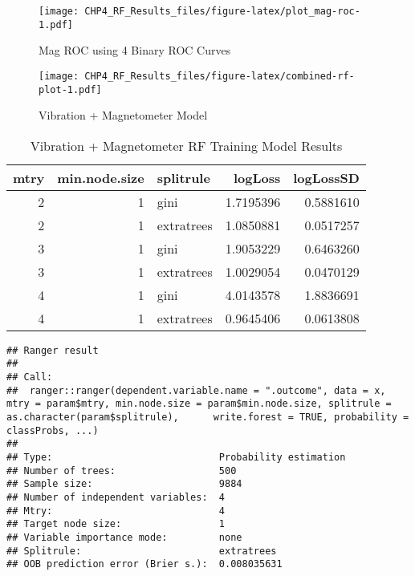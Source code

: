 \documentclass[]{article}
\begin{document}
\begin{figure}
\centering
\texttt{[image: CHP4\_RF\_Results\_files/figure-latex/plot\_mag-roc-1.pdf]}
\caption{Mag ROC using 4 Binary ROC Curves}
\end{figure}

\begin{figure}
\centering
\texttt{[image: CHP4\_RF\_Results\_files/figure-latex/combined-rf-plot-1.pdf]}
\caption{Vibration + Magnetometer Model}
\end{figure}

\begin{table}[!h]

\caption{\label{tab:combined-rf-params}Vibration + Magnetometer RF Training Model Results}
\centering
\begin{tabular}[t]{rrlrr}
\toprule
mtry & min.node.size & splitrule & logLoss & logLossSD\\
\midrule
2 & 1 & gini & 1.7195396 & 0.5881610\\
2 & 1 & extratrees & 1.0850881 & 0.0517257\\
3 & 1 & gini & 1.9053229 & 0.6463260\\
3 & 1 & extratrees & 1.0029054 & 0.0470129\\
4 & 1 & gini & 4.0143578 & 1.8836691\\
4 & 1 & extratrees & 0.9645406 & 0.0613808\\
\bottomrule
\end{tabular}
\end{table}

\begin{verbatim}
## Ranger result
## 
## Call:
##  ranger::ranger(dependent.variable.name = ".outcome", data = x,      mtry = param$mtry, min.node.size = param$min.node.size, splitrule = as.character(param$splitrule),      write.forest = TRUE, probability = classProbs, ...) 
## 
## Type:                             Probability estimation 
## Number of trees:                  500 
## Sample size:                      9884 
## Number of independent variables:  4 
## Mtry:                             4 
## Target node size:                 1 
## Variable importance mode:         none 
## Splitrule:                        extratrees 
## OOB prediction error (Brier s.):  0.008035631
\end{verbatim}
\end{document}
